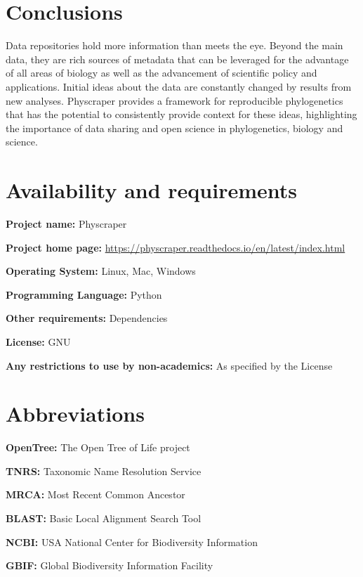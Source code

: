 \documentclass{bmcart}
\begin{document}
\section*{Conclusions}
Data repositories hold more information than meets the eye.
Beyond the main data, they are rich sources of metadata that can be leveraged
for the advantage of all areas of biology as well as the advancement of scientific
policy and applications.
Initial ideas about the data are constantly changed by results from new analyses.
Physcraper provides a framework for reproducible phylogenetics that has the
potential to consistently provide context for these ideas, highlighting the
importance of data sharing and open science in phylogenetics, biology and science.

\section*{Availability and requirements}

\par{\textbf{Project name:} Physcraper}

\textbf{Project home page:} \href{https://physcraper.readthedocs.io/en/latest/index.html}{https://physcraper.readthedocs.io/en/latest/index.html}

\textbf{Operating System:} Linux, Mac, Windows

\textbf{Programming Language:} Python

\textbf{Other requirements:} Dependencies

\textbf{License:} GNU

\textbf{Any restrictions to use by non-academics:} As specified by the License

\section*{Abbreviations}

\par{\textbf{OpenTree:} The Open Tree of Life project}

\textbf{TNRS:} Taxonomic Name Resolution Service

\textbf{MRCA:} Most Recent Common Ancestor

\textbf{BLAST:} Basic Local Alignment Search Tool

\textbf{NCBI:} USA National Center for Biodiversity Information

\textbf{GBIF:} Global Biodiversity Information Facility

\end{document}
